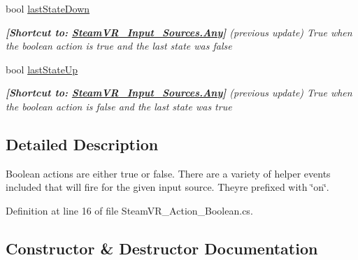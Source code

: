 \begin{DoxyCompactItemize}
bool \mbox{\hyperlink{class_valve_1_1_v_r_1_1_steam_v_r___action___boolean_a64ec97a985e100ec2279dbdd990e6667}{last\+State\+Down}}
\begin{DoxyCompactList}\small\item\em {\bfseries{\mbox{[}Shortcut to\+: \mbox{\hyperlink{namespace_valve_1_1_v_r_a82e5bf501cc3aa155444ee3f0662853faed36a1ef76a59ee3f15180e0441188ad}{Steam\+V\+R\+\_\+\+Input\+\_\+\+Sources.\+Any}}\mbox{]}}} (previous update) True when the boolean action is true and the last state was false \end{DoxyCompactList}\item 
bool \mbox{\hyperlink{class_valve_1_1_v_r_1_1_steam_v_r___action___boolean_a9ae6503bdd49781fff0a4ae2ed92a546}{last\+State\+Up}}
\begin{DoxyCompactList}\small\item\em {\bfseries{\mbox{[}Shortcut to\+: \mbox{\hyperlink{namespace_valve_1_1_v_r_a82e5bf501cc3aa155444ee3f0662853faed36a1ef76a59ee3f15180e0441188ad}{Steam\+V\+R\+\_\+\+Input\+\_\+\+Sources.\+Any}}\mbox{]}}} (previous update) True when the boolean action is false and the last state was true \end{DoxyCompactList}\end{DoxyCompactItemize}


\subsection{Detailed Description}
Boolean actions are either true or false. There are a variety of helper events included that will fire for the given input source. They\textquotesingle{}re prefixed with \char`\"{}on\char`\"{}. 



Definition at line 16 of file Steam\+V\+R\+\_\+\+Action\+\_\+\+Boolean.\+cs.



\subsection{Constructor \& Destructor Documentation}
\mbox{\label{class_valve_1_1_v_r_1_1_steam_v_r___action___boolean_a13dc81923871ae6d319c93a7df9e4e9d}} 
